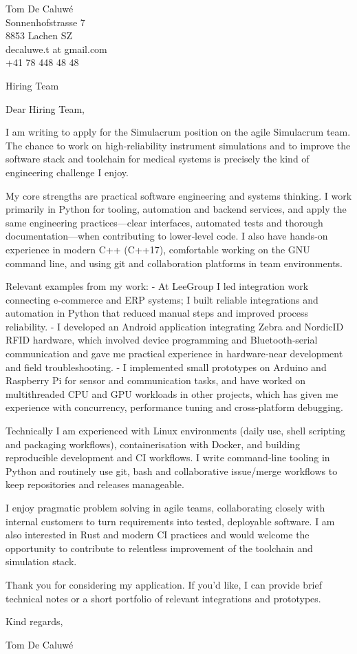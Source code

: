 \documentclass[12pt,a4paper]{letter}
\begin{document}

\begin{flushright}
Tom De Caluw\'e\\
Sonnenhofstrasse 7\\
8853 Lachen SZ\\
decaluwe.t at gmail.com\\
+41 78 448 48 48
\end{flushright}

\vspace{1em}

Hiring Team\\
\vspace{1em}

Dear Hiring Team,

I am writing to apply for the Simulacrum position on the agile Simulacrum team. The chance to work on high‑reliability instrument simulations and to improve the software stack and toolchain for medical systems is precisely the kind of engineering challenge I enjoy.

My core strengths are practical software engineering and systems thinking. I work primarily in Python for tooling, automation and backend services, and apply the same engineering practices—clear interfaces, automated tests and thorough documentation—when contributing to lower‑level code. I also have hands‑on experience in modern C++ (C++17), comfortable working on the GNU command line, and using git and collaboration platforms in team environments.

Relevant examples from my work:
- At LeeGroup I led integration work connecting e‑commerce and ERP systems; I built reliable integrations and automation in Python that reduced manual steps and improved process reliability.
- I developed an Android application integrating Zebra and NordicID RFID hardware, which involved device programming and Bluetooth‑serial communication and gave me practical experience in hardware‑near development and field troubleshooting.
- I implemented small prototypes on Arduino and Raspberry Pi for sensor and communication tasks, and have worked on multithreaded CPU and GPU workloads in other projects, which has given me experience with concurrency, performance tuning and cross‑platform debugging.

Technically I am experienced with Linux environments (daily use, shell scripting and packaging workflows), containerisation with Docker, and building reproducible development and CI workflows. I write command‑line tooling in Python and routinely use git, bash and collaborative issue/merge workflows to keep repositories and releases manageable.

I enjoy pragmatic problem solving in agile teams, collaborating closely with internal customers to turn requirements into tested, deployable software. I am also interested in Rust and modern CI practices and would welcome the opportunity to contribute to relentless improvement of the toolchain and simulation stack.

Thank you for considering my application. If you’d like, I can provide brief technical notes or a short portfolio of relevant integrations and prototypes.

Kind regards,

Tom De Caluw\'e
\end{document}
